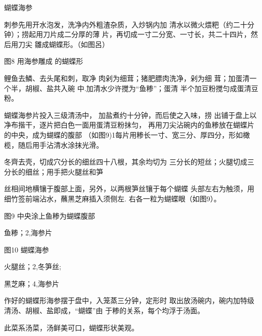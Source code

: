 \begin{recipe}{蝴蝶海参}

\ingredients



\cooking

\step 刺参先用开水泡发，洗净内外粗渣杂质，入炒锅内加 清水以微火煨粑（约二十分钟）；捞起用刀片成二分厚的薄 片，再切成一寸二分宽、一寸长，共二十四片，然后用刀尖 雛成蝴蝶形。（如图呂）

图8 用海参雕成 的蝴蝶形

\step 鲤鱼去鱗、去头尾和刺，取净 肉剁为细茸；猪肥膘肉洗净，剁为细 茸；加蛋清一个半，胡椒、盐共入碗 中.加清水少许搅为“鱼糁”；蛋清 半个加豆粉搅匀成蛋清豆粉。

\step 蝴蝶海参片投入三级清汤中， 加盐煮约十分钟，而后使之入味，捞 出铺于盘上以净布揩干，逐片把白色一面用蛋清豆粉抹匀， 再用刀尖沾碗内的鱼糁放在蝴蝶片的中央，成为蝴蝶的腹部 （如图9)1每片用糁长一寸、宽三分、厚四分，形如橄 榄，随后用手沾清水涂抹光滑。

\step 冬齊去壳，切成穴分长的细丝四十八根，其余均切为 三分长的短丝；火腿切成三分长的细丝；用手把火腿丝和笋

丝相间地横镶于腹部上面，另外，以两根笋丝镶于每个蝴蝶 头部左右为触须，用细竹签前端沾水，蘸黑芝麻插入须侧左. 右各一粒为蝴蝶眼（如图9）。

图9 中央涂上鱼糁为蝴蝶腹部

\step 鱼糁；2,海参片

图10 蝴蝶海参

\step 火腿丝；2,冬笋丝;

\step 黑芝麻；4,海参片

\step 作好的蝴蝶形海参摆于盘中，入笼蒸三分钟，定形时 取出放汤碗内，碗内加特级清汤、胡椒、盐即成，“蝴蝶”由 于糁的关系，每个均浮于汤面。

\notes

此菜系汤菜，汤鲜美可口，蝴蝶形状美观。

\end{recipe}

